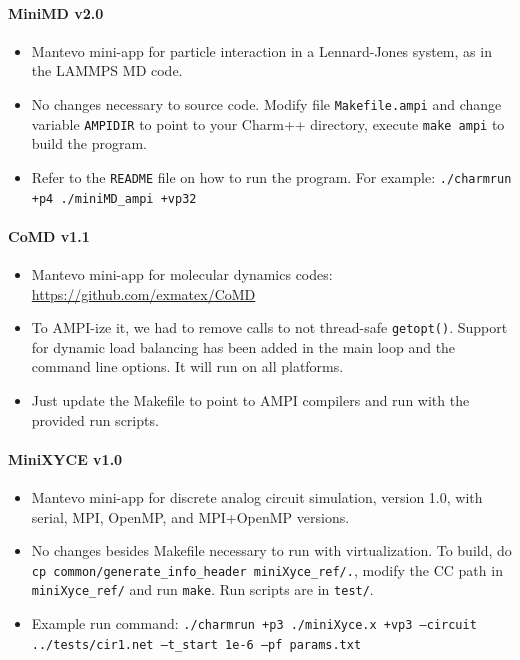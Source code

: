 \documentclass[10pt]{article}
\begin{document}
\paragraph{MiniMD v2.0}
    \begin{itemize}
    \item
      Mantevo mini-app for particle interaction in a Lennard-Jones
      system, as in the LAMMPS MD
      code.
    \item
      No changes necessary to source code. Modify file
      \texttt{Makefile.ampi} and change variable \texttt{AMPIDIR} to point to your
      Charm++ directory, execute \texttt{make ampi} to build the program.
    \item
      Refer to the \texttt{README} file on how to run the program. For
      example: \texttt{./charmrun +p4 ./miniMD\_ampi +vp32}
    \end{itemize}

\paragraph{CoMD v1.1}
    \begin{itemize}
    \item
      Mantevo mini-app for molecular dynamics
      codes: \url{https://github.com/exmatex/CoMD}
    \item
      To AMPI-ize it, we had to remove calls to not thread-safe \texttt{getopt()}.
      Support for dynamic load balancing has been added in the main
      loop and the command line options. It will run on all platforms.
    \item
      Just update the Makefile to point to AMPI compilers and run with the provided
      run scripts.
    \end{itemize}

\paragraph{MiniXYCE v1.0}
    \begin{itemize}
    \item
      Mantevo mini-app for discrete analog circuit simulation, version
      1.0, with serial, MPI, OpenMP, and MPI+OpenMP versions.
    \item
      No changes besides Makefile necessary to run with virtualization.
      To build, do \texttt{cp common/generate\_info\_header miniXyce\_ref/.},
      modify the CC path in \texttt{miniXyce\_ref/} and run \texttt{make}. Run scripts are
      in \texttt{test/}.
    \item
      Example run command: \texttt{./charmrun +p3 ./miniXyce.x +vp3 --circuit
      ../tests/cir1.net --t\_start 1e-6 --pf params.txt}
    \end{itemize}
\end{document}

